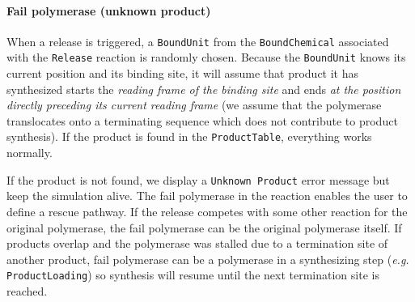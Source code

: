 \paragraph{Fail polymerase (unknown product)}
When a release is triggered, a \texttt{BoundUnit} from the \texttt{BoundChemical}
associated with the \texttt{Release} reaction is randomly chosen.
Because the \texttt{BoundUnit} knows its current position and its binding site,
it will assume that product it has synthesized starts the \emph{reading frame of the binding site}
and ends \emph{at the position directly preceding its current reading frame}
(we assume that the polymerase translocates onto a terminating sequence which does not contribute to product synthesis).
If the product is found in the \texttt{ProductTable}, everything works normally.

If the product is not found, we display a \texttt{Unknown Product} error message
but keep the simulation alive.
The fail polymerase in the reaction enables the user to define a rescue pathway.
If the release competes with some other reaction for the original polymerase,
the fail polymerase can be the original polymerase itself.
If products overlap and the polymerase was stalled due to a termination site of another product,
fail polymerase can be a polymerase in a synthesizing step (\textit{e.g.} \texttt{ProductLoading})
so synthesis will resume until the next termination site is reached.

